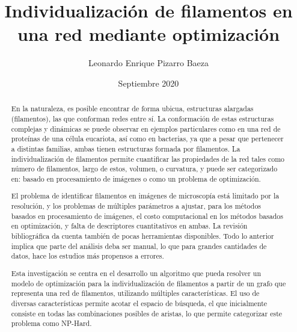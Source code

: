 \documentclass[upright, contnum]{umemoria}
\author{Leonardo Enrique Pizarro Baeza}
\title{Individualizaci\'on de filamentos en una red mediante optimizaci\'on}
\date{Septiembre 2020}
\begin{document}
\frontmatter
\maketitle

\begin{abstract}
En la naturaleza, es posible encontrar de forma ubicua, estructuras alargadas (filamentos), las que conforman redes entre s\'i.  La conformaci\'on de estas estructuras complejas y din\'amicas se puede observar en ejemplos
particulares como en una red de prote\'inas de una c\'elula eucariota, as\'i como en bacterias, ya que a pesar que pertenecer a distintas familias, ambas tienen estructuras formada por filamentos. La individualizaci\'on de filamentos permite cuantificar las propiedades de la red tales como n\'umero de filamentos, largo de estos, volumen, o curvatura, y  puede ser categorizado en: basado en procesamiento de im\'agenes o como un problema de optimizaci\'on.

El problema de identificar filamentos en im\'agenes de microscop\'ia est\'a limitado por la resoluci\'on, y los problemas de m\'ultiples par\'ametros a ajustar, para los m\'etodos basados en procesamiento de im\'agenes, el costo
computacional en los m\'etodos basados en optimizaci\'on, y falta de descriptores cuantitativos en ambas. La revisi\'on bibliogr\'afica da cuenta tambi\'en de pocas herramientas disponibles. Todo lo anterior implica que parte del an\'alisis deba ser manual, lo que para grandes cantidades de datos, hace los estudios más propensos a errores.

Esta investigación se centra en el desarrollo un algoritmo que pueda resolver un modelo de optimizaci\'on para la individualizaci\'on de filamentos a partir de un grafo que representa una red de filamentos, utilizando m\'ultiples caracter\'isticas. El uso de diversas caracter\'isticas permite acotar el espacio de b\'usqueda, el que inicialmente consiste en todas las combinaciones posibles de aristas, lo que permite categorizar este problema como NP-Hard.




\end{abstract}
\end{document}
